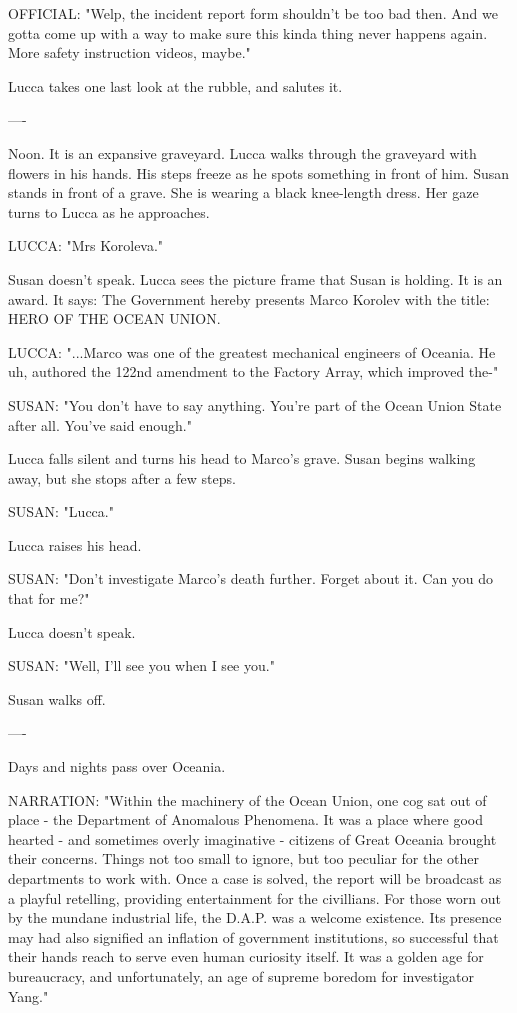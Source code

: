 \documentclass[11pt]{article}
\begin{document}
OFFICIAL: "Welp, the incident report form shouldn't be too bad then. 
And we gotta come up with a way to make sure this kinda thing never happens again. 
More safety instruction videos, maybe."

Lucca takes one last look at the rubble, and salutes it.

----

Noon. It is an expansive graveyard. 
Lucca walks through the graveyard with flowers in his hands. 
His steps freeze as he spots something in front of him. 
Susan stands in front of a grave. She is wearing a black knee-length dress. 
Her gaze turns to Lucca as he approaches. 

LUCCA: "Mrs Koroleva."

Susan doesn't speak. 
Lucca sees the picture frame that Susan is holding. 
It is an award.
It says: The Government hereby presents Marco Korolev with the title: HERO OF THE OCEAN UNION.

LUCCA: "...Marco was one of the greatest mechanical engineers of Oceania. 
He uh, authored the 122nd amendment to the Factory Array, which improved the-"

SUSAN: "You don't have to say anything. You're part of the Ocean Union State after all. You've said enough."

Lucca falls silent and turns his head to Marco's grave. Susan begins walking away, but she stops after a few steps. 

SUSAN: "Lucca."

Lucca raises his head.

SUSAN: "Don't investigate Marco's death further. Forget about it. Can you do that for me?"

Lucca doesn't speak.

SUSAN: "Well, I'll see you when I see you."

Susan walks off.

----

Days and nights pass over Oceania. 

NARRATION: "Within the machinery of the Ocean Union, one cog sat out of place - the Department of Anomalous Phenomena. 
It was a place where good hearted - and sometimes overly imaginative - citizens of Great Oceania brought their concerns. 
Things not too small to ignore, but too peculiar for the other departments to work with. 
Once a case is solved, the report will be broadcast as a playful retelling, providing entertainment for the civillians. 
For those worn out by the mundane industrial life, the D.A.P. was a welcome existence. 
Its presence may had also signified an inflation of government institutions, 
so successful that their hands reach to serve even human curiosity itself. 
It was a golden age for bureaucracy, and unfortunately, an age of supreme boredom for investigator Yang."
\end{document}

